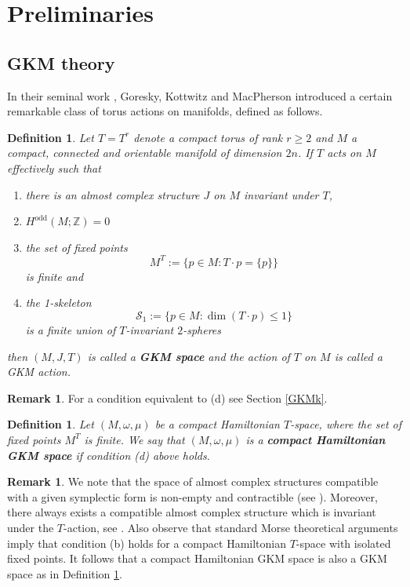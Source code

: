 \documentclass[12pt,a4paper]{amsart}
\theoremstyle{plain}
\newtheorem{defn}[thm]{Definition}
\theoremstyle{definition}
\newtheorem{rem}[thm]{Remark}
\begin{document}
\section{Preliminaries}
\subsection{GKM theory}\label{subsection GKM theory}
In their seminal work \cite{MR1489894}, Goresky, Kottwitz and MacPherson introduced 
a certain remarkable class of torus actions on manifolds, defined as follows. 

\begin{defn}\label{D: GKM manifold}
Let $T=T^{r}$ denote a compact torus of rank $r\geq 2$ and $M$ a compact, connected and orientable manifold of
dimension $2n$. If $T$ acts on $M$ effectively such that
\begin{enumerate}[label=(\alph*)]
	\item there is an almost complex structure $J$ on $M$ invariant under $T$, 
	\item $H^{\mathrm{odd}}(M;\mathbb{Z}) = 0$
	\item the set of fixed points
		\[
			M^{T} := \{p \in M \colon  T \cdot p = \{p\}\} 
		\]
		is finite and
	\item the \emph{1-skeleton} $$\mathcal{S}_{1} := \{ p \in M \colon \dim(T \cdot p)
		\leq 1\}$$ is a finite union of $T$-invariant $2$-spheres
\end{enumerate}
then $(M,J,T)$ is called a \textbf{GKM space} and the action of $T$ on $M$ is called a
\emph{GKM action}. 
\end{defn}
\begin{rem}
For a condition equivalent to (d) see Section \ref{GKMk}.
\end{rem}

\begin{defn}\label{def Ham GKM}
Let $(M,\omega,\mu)$ be a compact Hamiltonian $T$-space, where the set of fixed points $M^T$ is finite. We say that 
$(M,\omega,\mu)$ is a \textbf{compact Hamiltonian GKM space} if condition (d) above holds. 
\end{defn}

\begin{rem}\label{rem: contractible set of acs}
We note that the
space of almost complex structures compatible with a given symplectic form is non-empty and
contractible (see  \cite[Proposition 4.1.1]{MR3674984}). 
Moreover, there always exists a compatible
almost complex structure which is invariant under the $T$-action, see \cite[Lemma
5.5.6]{MR3674984}. Also observe that standard Morse theoretical arguments imply that
condition (b) holds for a compact Hamiltonian $T$-space with isolated fixed points.
It follows that a compact Hamiltonian GKM space is also a GKM space as in Definition \ref{D: GKM manifold}.
\end{rem}
\end{document}
